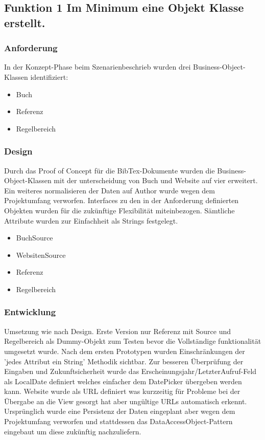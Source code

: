 \subsection[Funktion1 Objektklassen]{Funktion 1 Im Minimum eine Objekt Klasse erstellt.}

\subsubsection{Anforderung}
In der Konzept-Phase beim Szenarienbeschrieb wurden drei Business-Object-Klassen identifiziert:
\begin{itemize}
	\item Buch
	\item Referenz
	\item Regelbereich
\end{itemize}

\subsubsection{Design}
Durch das Proof of Concept für die BibTex-Dokumente wurden die Business-Object-Klassen mit der unterscheidung von Buch und Website auf vier erweitert.\\
Ein weiteres normalisieren der Daten auf Author wurde wegen dem Projektumfang verworfen. Interfaces zu den in der Anforderung definierten Objekten wurden für die zukünftige Flexibilität miteinbezogen. Sämtliche Attribute wurden zur Einfachheit als Strings festgelegt.
\begin{itemize}
	\item BuchSource
	\item WebsitenSource
	\item Referenz
	\item Regelbereich
\end{itemize}

\subsubsection{Entwicklung}
Umsetzung wie nach Design. Erste Version nur Referenz mit Source und Regelbereich als Dummy-Objekt zum Testen bevor die Vollständige funktionalität umgesetzt wurde. Nach dem ersten Prototypen wurden Einschränkungen der 'jedes Attribut ein String' Methodik sichtbar. Zur besseren Überprüfung der Eingaben und Zukunftsicherheit wurde das Erscheinungsjahr/LetzterAufruf-Feld als LocalDate definiert welches einfacher dem DatePicker übergeben werden kann. Website wurde als URL definiert was kurzzeitig für Probleme bei der Übergabe an die View gesorgt hat aber ungültige URLs automatisch erkennt. Ursprünglich wurde eine Persistenz der Daten eingeplant aber wegen dem Projektumfang verworfen und stattdessen das DataAccessObject-Pattern eingebaut um diese zukünftig nachzuliefern.

